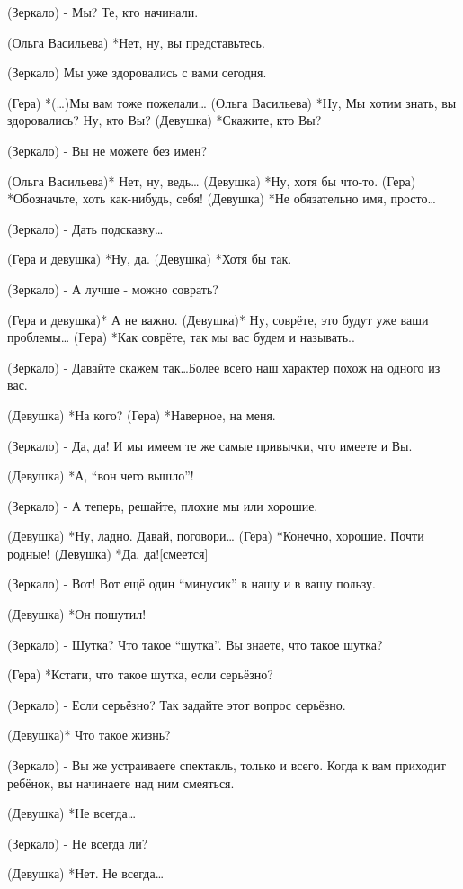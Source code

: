 (Зеркало) - Мы? Те, кто начинали.

(Ольга Васильева) *Нет, ну, вы представьтесь.

(Зеркало) Мы уже здоровались с вами сегодня.

(Гера) *(…)Мы вам тоже пожелали…
(Ольга Васильева) *Ну, Мы хотим знать, вы здоровались? Ну, кто Вы?
(Девушка) *Скажите, кто Вы?

(Зеркало) - Вы не можете без имен? 

(Ольга Васильева)* Нет, ну, ведь…
(Девушка) *Ну, хотя бы что-то.
(Гера) *Обозначьте, хоть как-нибудь, себя!
(Девушка) *Не обязательно имя, просто…

(Зеркало) - Дать подсказку…

(Гера и девушка) *Ну, да.
(Девушка) *Хотя бы так.

(Зеркало) - А лучше - можно соврать?

(Гера и девушка)* А не важно.
(Девушка)* Ну, соврёте, это будут уже ваши проблемы…
(Гера) *Как соврёте,  так мы вас будем и называть..

(Зеркало) - Давайте скажем так…Более всего наш характер похож на одного из вас.

(Девушка) *На кого?
(Гера) *Наверное, на меня.

(Зеркало)  - Да, да! И мы имеем те же самые привычки, что имеете и Вы.

(Девушка) *А, “вон чего вышло”!

(Зеркало)  - А теперь, решайте, плохие мы или хорошие.

(Девушка) *Ну, ладно. Давай, поговори…
(Гера) *Конечно, хорошие.  Почти родные!
(Девушка) *Да, да![смеется]

(Зеркало) - Вот! Вот ещё один “минусик” в нашу и в вашу пользу.

(Девушка) *Он пошутил!

(Зеркало) - Шутка? Что такое “шутка”. Вы знаете, что такое шутка?

(Гера) *Кстати, что такое шутка, если серьёзно?

(Зеркало) - Если серьёзно? Так задайте этот вопрос серьёзно. 

(Девушка)* Что такое жизнь?

(Зеркало) - Вы же устраиваете спектакль, только и всего. Когда к вам приходит ребёнок, вы начинаете над ним смеяться. 

(Девушка) *Не всегда…

(Зеркало) - Не всегда ли?

(Девушка) *Нет. Не всегда…

